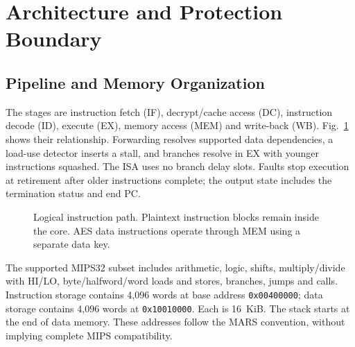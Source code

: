 \documentclass[conference,a4paper]{IEEEtran}
\begin{document}
\section{Architecture and Protection Boundary}
\subsection{Pipeline and Memory Organization}
The stages are instruction fetch (IF), decrypt/cache access (DC), instruction
decode (ID), execute (EX), memory access (MEM) and write-back (WB).
Fig.~\ref{fig:architecture} shows their relationship. Forwarding resolves
supported data dependencies, a load-use detector inserts a stall, and branches
resolve in EX with younger instructions squashed. The ISA uses no branch delay
slots. Faults stop execution at retirement after older instructions complete;
the output state includes the termination status and end PC.

\begin{figure}[t]
\centering
{}
\caption{Logical instruction path. Plaintext instruction blocks remain inside
the core. AES data instructions operate through MEM using a separate data key.}
\label{fig:architecture}
\end{figure}

The supported MIPS32 subset includes arithmetic, logic, shifts, multiply/divide
with HI/LO, byte/halfword/word loads and stores, branches, jumps and calls.
Instruction storage contains 4,096 words at base address \texttt{0x00400000};
data storage contains 4,096 words at \texttt{0x10010000}. Each is 16~KiB.
The stack starts at the end of data memory. These addresses follow the MARS
convention, without implying complete MIPS compatibility.
\end{document}
